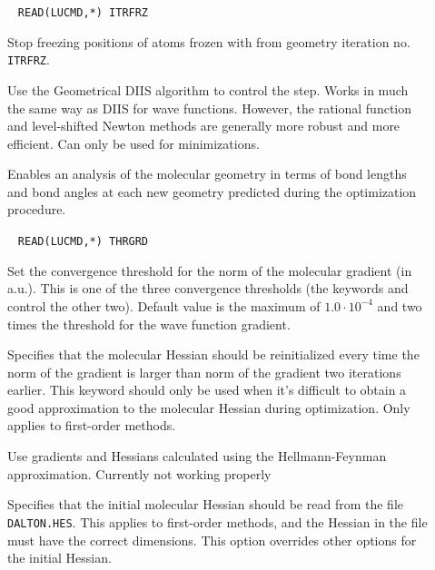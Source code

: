 \begin{description}
\item[]\verb| | \newline
\verb|READ(LUCMD,*) ITRFRZ|

Stop freezing positions of atoms frozen with  from geometry iteration no. \verb|ITRFRZ|.

\item[]
Use the Geometrical DIIS\cite{pcppjms114}
algorithm to control the
step. Works in much the same way as DIIS for wave functions. However,
the rational function and level-shifted Newton methods are generally
more robust and more efficient. Can only be used for minimizations.

\item[]
Enables an analysis of the molecular geometry in terms of bond lengths
and bond angles at each new geometry predicted during the optimization
procedure.

\item[]\verb| |
\newline
\verb|READ(LUCMD,*) THRGRD|

Set the convergence threshold for the norm of the molecular gradient (in
a.u.). This is one of
the three convergence thresholds (the keywords  and
 control the other two). Default value is the maximum of
$1.0\cdot 10^{-4}$ and two times the threshold for the wave function
gradient.

\item[]
Specifies that the molecular Hessian should be
reinitialized every time the norm
of the gradient is larger than norm of the gradient two iterations
earlier. This keyword should only be used when it's difficult to
obtain a good approximation to the molecular Hessian during optimization. Only
applies to first-order methods.

\item[]
Use gradients and Hessians calculated using the Hellmann-Feynman
approximation. Currently not working properly

\item[]
Specifies that the initial molecular Hessian
should be read from the file \verb|DALTON.HES|. This applies to first-order
methods, and the Hessian in the file must have the correct
dimensions. This option overrides other options for the initial Hessian.


\end{description}
